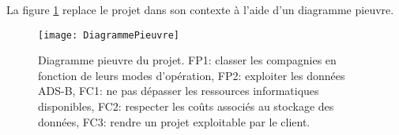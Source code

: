 La figure \ref{fig:pieuvre} replace le projet dans son contexte à l'aide d'un diagramme pieuvre.

\begin{figure}[!ht]
	\centering
	\texttt{[image: DiagrammePieuvre]}
	\caption{
		Diagramme pieuvre du projet. FP1: classer les compagnies
		en fonction de leurs modes d'opération, FP2: exploiter les données ADS-B, 
		FC1: ne pas dépasser les ressources informatiques disponibles,
		FC2: respecter les coûts associés au stockage des données,
		FC3: rendre un projet exploitable par le client.
	}
	\label{fig:pieuvre}
\end{figure}


